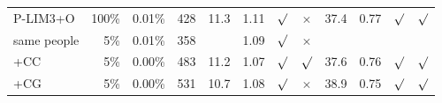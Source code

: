 \begin{center}
\begin{tabular}{@{}lrrrrrccrrcc@{}}
\addlinespace
P-LIM3+O & 100\% & 0.01\% & 428 & 11.3 & 1.11 & $\surd$ & $\times$ & 37.4 & 0.77 & $\surd$ & $\surd$ \\
\quad same people & 5\% & 0.01\% & 358 & & 1.09 & $\surd$ & $\times$ & & & & \\
\quad +CC & 5\% & 0.00\% & 483 & 11.2 & 1.07 & $\surd$ & $\surd$ & 37.6 & 0.76 & $\surd$ & $\surd$ \\
\quad +CG & 5\% & 0.00\% & 531 & 10.7 & 1.08 & $\surd$ & $\times$ & 38.9 & 0.75 & $\surd$ & $\surd$ \\
\bottomrule
\end{tabular}
\end{center}
